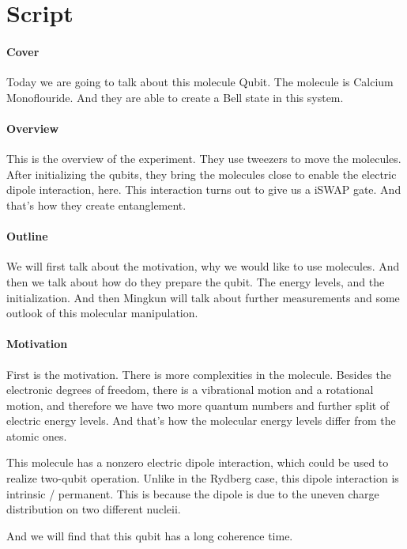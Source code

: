 \documentclass{article}
\begin{document}
\clearpage
\section{Script}

\paragraph*{Cover}
Today we are going to talk about this molecule Qubit.
The molecule is Calcium Monoflouride.
And they are able to create a Bell state in this system.


\paragraph*{Overview}
This is the overview of the experiment.
They use tweezers to move the molecules.
After initializing the qubits, they bring the molecules close to enable the electric dipole interaction, here.
This interaction turns out to give us a iSWAP gate.
And that's how they create entanglement.

\paragraph*{Outline}
We will first talk about the motivation, why we would like to use molecules.
And then we talk about how do they prepare the qubit.
The energy levels, and the initialization.
And then Mingkun will talk about further measurements and some outlook of this molecular manipulation.

\paragraph*{Motivation}

First is the motivation.
There is more complexities in the molecule.
Besides the electronic degrees of freedom, there is a vibrational motion and a rotational motion, and therefore we have two more quantum numbers and further split of electric energy levels.
And that's how the molecular energy levels differ from the atomic ones.

This molecule has a nonzero electric dipole interaction, which could be used to realize two-qubit operation.
Unlike in the Rydberg case, this dipole interaction is intrinsic / permanent.
This is because the dipole is due to the uneven charge distribution on two different nucleii.

And we will find that this qubit has a long coherence time.
\end{document}
